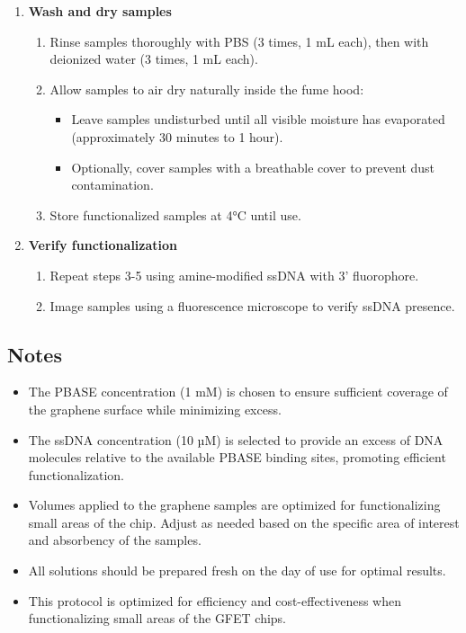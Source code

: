 \documentclass[11pt]{article}
\begin{document}
\begin{enumerate}
    \item \textbf{Wash and dry samples}
    \begin{enumerate}[label=(\alph*)]
        \item Rinse samples thoroughly with PBS (3 times, 1 mL each), then with deionized water (3 times, 1 mL each).
        \item Allow samples to air dry naturally inside the fume hood:
        \begin{itemize}
            \item Leave samples undisturbed until all visible moisture has evaporated (approximately 30 minutes to 1 hour).
            \item Optionally, cover samples with a breathable cover to prevent dust contamination.
        \end{itemize}
        \item Store functionalized samples at 4°C until use.
    \end{enumerate}

    \item \textbf{Verify functionalization}
    \begin{enumerate}[label=(\alph*)]
        \item Repeat steps 3-5 using amine-modified ssDNA with 3' fluorophore.
        \item Image samples using a fluorescence microscope to verify ssDNA presence.
    \end{enumerate}
\end{enumerate}

\subsection*{Notes}
\begin{itemize}
    \item The PBASE concentration (1 mM) is chosen to ensure sufficient coverage of the graphene surface while minimizing excess.
    \item The ssDNA concentration (10 µM) is selected to provide an excess of DNA molecules relative to the available PBASE binding sites, promoting efficient functionalization.
    \item Volumes applied to the graphene samples are optimized for functionalizing small areas of the chip. Adjust as needed based on the specific area of interest and absorbency of the samples.
    \item All solutions should be prepared fresh on the day of use for optimal results.
    \item This protocol is optimized for efficiency and cost-effectiveness when functionalizing small areas of the GFET chips.
\end{itemize}
\end{document}
